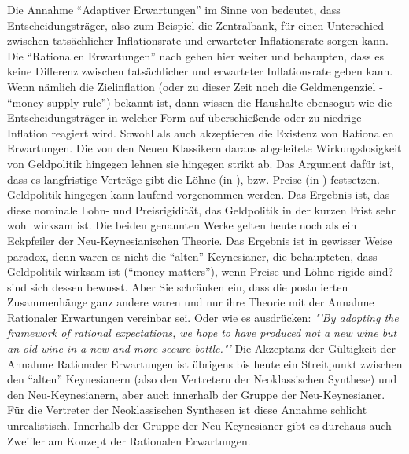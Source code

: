 Die Annahme "`Adaptiver Erwartungen"' im Sinne von \textcite{Phelps1968} bedeutet, dass Entscheidungsträger, also zum Beispiel die Zentralbank, für einen Unterschied zwischen tatsächlicher Inflationsrate und erwarteter Inflationsrate sorgen kann. Die "`Rationalen Erwartungen"' nach \textcite{Lucas1976} gehen hier weiter und behaupten, dass es keine Differenz zwischen tatsächlicher und erwarteter Inflationsrate geben kann. Wenn nämlich die Zielinflation (oder zu dieser Zeit noch die Geldmengenziel - "`money supply rule"') bekannt ist, dann wissen die Haushalte ebensogut wie die Entscheidungsträger in welcher Form auf überschießende oder zu niedrige Inflation reagiert wird.  Sowohl \textcite{Fischer1977} als auch \textcite{Taylor1977} akzeptieren die Existenz von Rationalen Erwartungen. Die von den Neuen Klassikern daraus abgeleitete Wirkungslosigkeit von Geldpolitik hingegen lehnen sie hingegen strikt ab. Das Argument dafür ist, dass es langfristige Verträge gibt die Löhne (in \textcite{Fischer1977}), bzw. Preise (in \textcite{Taylor1977}) festsetzen. Geldpolitik hingegen kann laufend vorgenommen werden. Das Ergebnis ist, das diese nominale Lohn- und Preisrigidität, das Geldpolitik in der kurzen Frist sehr wohl wirksam ist. Die beiden genannten Werke gelten heute noch als ein Eckpfeiler der Neu-Keynesianischen Theorie. Das Ergebnis ist in gewisser Weise paradox, denn waren es nicht die "`alten"' Keynesianer, die behaupteten, dass Geldpolitik wirksam ist ("`money matters"'), wenn Preise und Löhne rigide sind? \textcite[S. 166]{Taylor1977} sind sich dessen bewusst. Aber Sie schränken ein, dass die postulierten Zusammenhänge ganz andere waren und nur ihre Theorie mit der Annahme Rationaler Erwartungen vereinbar sei. Oder wie es \textcite[S. 166]{Taylor1977} ausdrücken: \textit{"'By adopting the framework of rational expectations, we hope to have produced not a new wine but an old wine in a new and more secure bottle."'}
Die Akzeptanz der Gültigkeit der Annahme Rationaler Erwartungen ist übrigens bis heute ein Streitpunkt zwischen den "`alten"' Keynesianern (also den Vertretern der Neoklassischen Synthese) und den Neu-Keynesianern, aber auch innerhalb der Gruppe der Neu-Keynesianer. Für die Vertreter der Neoklassischen Synthesen ist diese Annahme schlicht unrealistisch. Innerhalb der Gruppe der Neu-Keynesianer gibt es durchaus auch Zweifler am Konzept der Rationalen Erwartungen.

